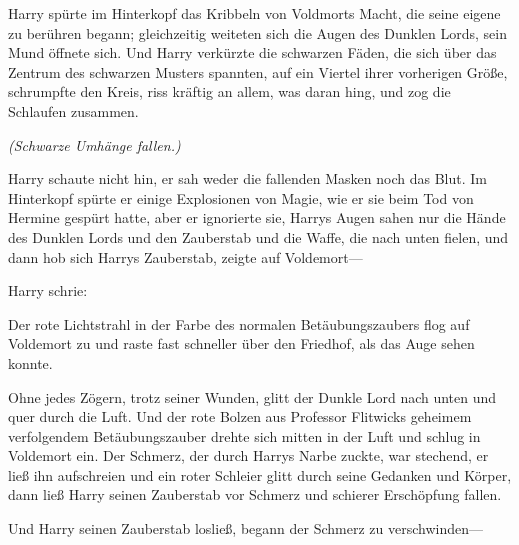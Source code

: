 Harry spürte im Hinterkopf das Kribbeln von Voldmorts Macht, die seine eigene zu berühren begann; gleichzeitig weiteten sich die Augen des Dunklen Lords, sein Mund öffnete sich.
Und Harry verkürzte die schwarzen Fäden, die sich über das Zentrum des schwarzen Musters spannten, auf ein Viertel ihrer vorherigen Größe, schrumpfte den Kreis, riss kräftig an allem, was daran hing, und zog die Schlaufen zusammen.

\emph{(Schwarze Umhänge fallen.)}

Harry schaute nicht hin, er sah weder die fallenden Masken noch das Blut. Im Hinterkopf spürte er einige Explosionen von Magie, wie er sie beim Tod von Hermine gespürt hatte, aber er ignorierte sie, Harrys Augen sahen nur die Hände des Dunklen Lords und den Zauberstab und die Waffe, die nach unten fielen, und dann hob sich Harrys Zauberstab, zeigte auf Voldemort—

Harry schrie: 

Der rote Lichtstrahl in der Farbe des normalen Betäubungszaubers flog auf Voldemort zu und raste fast schneller über den Friedhof, als das Auge sehen konnte.

Ohne jedes Zögern, trotz seiner Wunden, glitt der Dunkle Lord nach unten und quer durch die Luft. Und der rote Bolzen aus Professor Flitwicks geheimem verfolgendem Betäubungszauber drehte sich mitten in der Luft und schlug in Voldemort ein.
Der Schmerz, der durch Harrys Narbe zuckte, war stechend, er ließ ihn aufschreien und ein roter Schleier glitt durch seine Gedanken und Körper, dann ließ Harry seinen Zauberstab vor Schmerz und schierer Erschöpfung fallen.

Und Harry seinen Zauberstab losließ, begann der Schmerz zu verschwinden—

